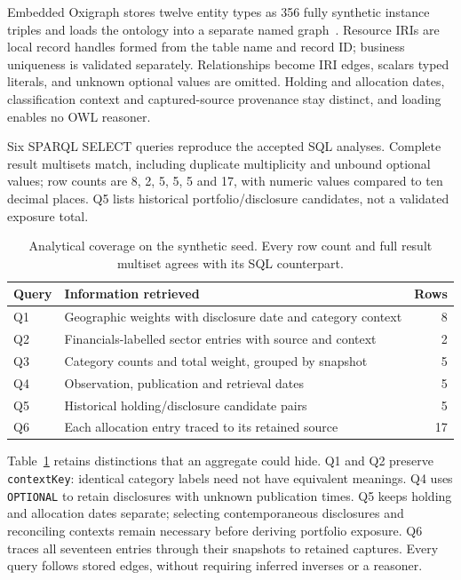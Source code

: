 Embedded Oxigraph stores twelve entity types as 356 fully synthetic instance
triples and loads the ontology into a separate named graph~\cite{pyoxigraph}.
Resource IRIs are local record handles formed from the table name and record ID; business
uniqueness is validated separately. Relationships become IRI edges, scalars typed
literals, and unknown optional values are omitted. Holding and allocation dates,
classification context and captured-source provenance stay distinct, and loading
enables no OWL reasoner.

Six SPARQL SELECT queries reproduce the accepted SQL analyses. Complete result
multisets match, including duplicate multiplicity and unbound optional values;
row counts are 8, 2, 5, 5, 5 and 17, with numeric values compared to ten decimal
places. Q5 lists historical portfolio/disclosure candidates, not a validated
exposure total.

\begin{table}[tb]
\centering
\caption{Analytical coverage on the synthetic seed. Every row count and full
result multiset agrees with its SQL counterpart.}
\label{tab:queries}
\footnotesize
\begin{tabular}{@{}lp{}r@{}}
\toprule
Query & Information retrieved & Rows \\
\midrule
Q1 & Geographic weights with disclosure date and category context & 8 \\
Q2 & Financials-labelled sector entries with source and context & 2 \\
Q3 & Category counts and total weight, grouped by snapshot & 5 \\
Q4 & Observation, publication and retrieval dates & 5 \\
Q5 & Historical holding/disclosure candidate pairs & 5 \\
Q6 & Each allocation entry traced to its retained source & 17 \\
\bottomrule
\end{tabular}
\end{table}

Table~\ref{tab:queries} retains distinctions that an aggregate could hide.
Q1 and Q2 preserve \texttt{contextKey}: identical category labels need not
have equivalent meanings. Q4 uses \texttt{OPTIONAL} to retain disclosures with
unknown publication times. Q5 keeps holding and allocation dates separate;
selecting contemporaneous disclosures and reconciling contexts remain necessary
before deriving portfolio exposure. Q6 traces all seventeen entries through their
snapshots to retained captures. Every query follows stored edges, without
requiring inferred inverses or a reasoner.

